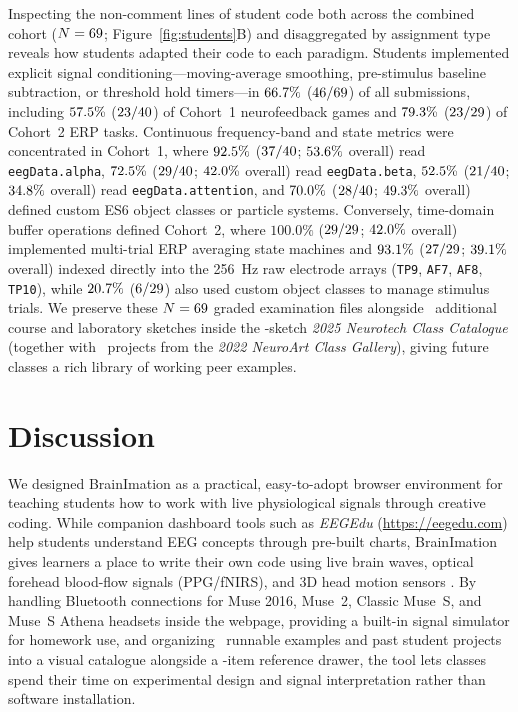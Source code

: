 \documentclass[11pt]{article}
\begin{document}
Inspecting the non-comment lines of student code both across the combined cohort ($N = 69$; Figure~\ref{fig:students}B) and disaggregated by assignment type reveals how students adapted their code to each paradigm. Students implemented explicit signal conditioning---moving-average smoothing, pre-stimulus baseline subtraction, or threshold hold timers---in $66.7\%$ ($46/69$) of all submissions, including $57.5\%$ ($23/40$) of Cohort~1 neurofeedback games and $79.3\%$ ($23/29$) of Cohort~2 ERP tasks. Continuous frequency-band and state metrics were concentrated in Cohort~1, where $92.5\%$ ($37/40$; $53.6\%$ overall) read \texttt{eegData.alpha}, $72.5\%$ ($29/40$; $42.0\%$ overall) read \texttt{eegData.beta}, $52.5\%$ ($21/40$; $34.8\%$ overall) read \texttt{eegData.attention}, and $70.0\%$ ($28/40$; $49.3\%$ overall) defined custom ES6 object classes or particle systems. Conversely, time-domain buffer operations defined Cohort~2, where $100.0\%$ ($29/29$; $42.0\%$ overall) implemented multi-trial ERP averaging state machines and $93.1\%$ ($27/29$; $39.1\%$ overall) indexed directly into the 256~Hz raw electrode arrays (\texttt{TP9}, \texttt{AF7}, \texttt{AF8}, \texttt{TP10}), while $20.7\%$ ($6/29$) also used custom object classes to manage stimulus trials. We preserve these $N = 69$ graded examination files alongside \NAdditionalSketches\ additional course and laboratory sketches inside the \NNeurotechCatalogue-sketch \emph{2025 Neurotech Class Catalogue} (together with \NNeuroArtGallery\ projects from the \emph{2022 NeuroArt Class Gallery}), giving future classes a rich library of working peer examples.

\section{Discussion}
We designed BrainImation as a practical, easy-to-adopt browser environment for teaching students how to work with live physiological signals through creative coding. While companion dashboard tools such as \emph{EEGEdu} (\url{https://eegedu.com}) \citep{mathewson2026eegedu} help students understand EEG concepts through pre-built charts, BrainImation gives learners a place to write their own code using live brain waves, optical forehead blood-flow signals (PPG/fNIRS), and 3D head motion sensors \citep{papert1980mindstorms,resnick2009scratch,deleeuw2015jspsych}. By handling Bluetooth connections for Muse 2016, Muse~2, Classic Muse~S, and Muse~S Athena headsets inside the webpage, providing a built-in signal simulator for homework use, and organizing \NCatalogueSketches\ runnable examples and past student projects into a visual catalogue alongside a \NRefAPIs-item reference drawer, the tool lets classes spend their time on experimental design and signal interpretation rather than software installation.
\end{document}
